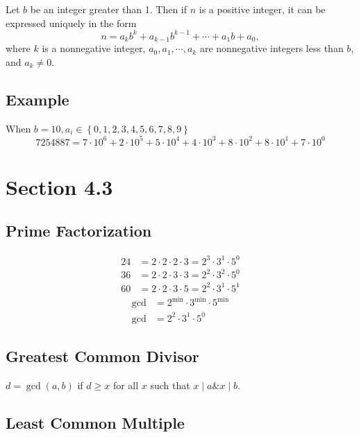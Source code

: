 \documentclass{article}
\begin{document}
Let $ b $ be an integer greater than 1. Then if $ n $ is a positive integer, it can be expressed uniquely in the form
\begin{equation}
	n = a_kb^k + a_{k - 1}b^{k - 1} + \cdots + a_1b + a_0,
\end{equation}
where $ k $ is a nonnegative integer, $ a_0, a_1, \cdots, a_k $ are nonnegative integers less than $ b $, and $ a_k \neq 0 $.

\subsection{Example}

When $ b = 10, a_i \in \left\{ 0, 1, 2, 3, 4, 5, 6, 7, 8, 9 \right\} $
\begin{equation*}
	7254887 = 7 \cdot 10^6 + 2 \cdot 10^5 + 5 \cdot 10^4 + 4 \cdot 10^3 + 8 \cdot 10^2 + 8 \cdot 10^1 + 7 \cdot 10^0
\end{equation*}

\section{Section 4.3}

\subsection{Prime Factorization}

\begin{align*}
	24 & = 2 \cdot 2 \cdot 2 \cdot 3 = 2^3 \cdot 3^1 \cdot 5^0 \\
	36 & = 2 \cdot 2 \cdot 3 \cdot 3 = 2^2 \cdot 3^2 \cdot 5^0 \\
	60 & = 2 \cdot 2 \cdot 3 \cdot 5 = 2^2 \cdot 3^1 \cdot 5^1
\end{align*}
\begin{align*}
	\text{gcd} & = 2^{\min} \cdot 3^{\min} \cdot 5^{\min} \\
	\text{gcd} & = 2^{2} \cdot 3^{1} \cdot 5^{0}
\end{align*}

\subsection{Greatest Common Divisor}

$ d = \gcd(a, b) $ if $ d \geq x $ for all $ x $ such that $ x \mid a \& x \mid b $.

\subsection{Least Common Multiple}
\end{document}
